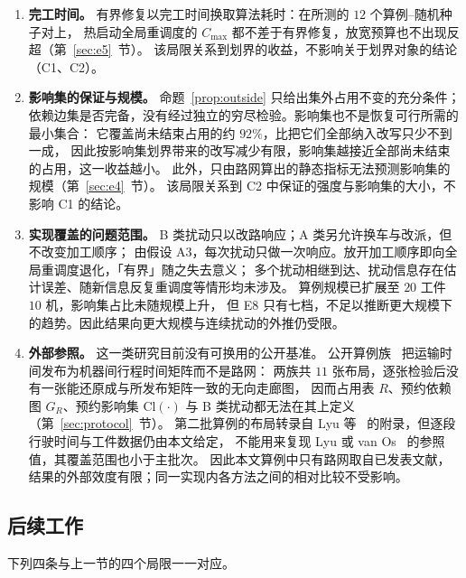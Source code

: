 \documentclass[manuscript,screen,review]{acmart}
\newcommand{\EfiveCells}{12}        %
\newcommand{\ClosureAliveFrac}{92\%}
\newcommand{\ScaleJobsHi}{20}
\newcommand{\ScaleMachHi}{10}
\begin{document}
\begin{enumerate}[leftmargin=1.6em,itemsep=0.35em]
\item \textbf{完工时间。} 有界修复以完工时间换取算法耗时：在所测的 \(\EfiveCells\) 个算例--随机种子对上，
热启动全局重调度的 \(C_{\max}\) 都不差于有界修复，放宽预算也不出现反超（第~\ref{sec:e5}~节）。
该局限关系到划界的收益，不影响关于划界对象的结论（C1、C2）。

\item \textbf{影响集的保证与规模。} 命题~\ref{prop:outside} 只给出集外占用不变的充分条件；
依赖边集是否完备，没有经过独立的穷尽检验。影响集也不是恢复可行所需的最小集合：
它覆盖尚未结束占用的约 \(\ClosureAliveFrac\)，比把它们全部纳入改写只少不到一成，
因此按影响集划界带来的改写减少有限，影响集越接近全部尚未结束的占用，这一收益越小。
此外，只由路网算出的静态指标无法预测影响集的规模（第~\ref{sec:e4}~节）。
该局限关系到 C2 中保证的强度与影响集的大小，不影响 C1 的结论。

\item \textbf{实现覆盖的问题范围。} B 类扰动只以改路响应；A 类另允许换车与改派，但不改变加工顺序；
由假设 A3，每次扰动只做一次响应。放开加工顺序即向全局重调度退化，「有界」随之失去意义；
多个扰动相继到达、扰动信息存在估计误差、随新信息反复重调度等情形均未涉及。
算例规模已扩展至 \(\ScaleJobsHi\) 工件 \(\ScaleMachHi\) 机，影响集占比未随规模上升，
但 E8 只有七档，不足以推断更大规模下的趋势。因此结果向更大规模与连续扰动的外推仍受限。

\item \textbf{外部参照。} 这一类研究目前没有可换用的公开基准。
公开算例族~\cite{homayouni2021production,fontes2023hybrid} 把运输时间发布为机器间行程时间矩阵而不是路网：
两族共 \(11\) 张布局，逐张检验后没有一张能还原成与所发布矩阵一致的无向走廊图，
因而占用表 \(R\)、预约依赖图 \(G_R\)、预约影响集 \(\mathrm{Cl}(\cdot)\) 与 B 类扰动都无法在其上定义（第~\ref{sec:protocol}~节）。
第二批算例的布局转录自 Lyu 等~\cite{lyu2019approach} 的附录，但逐段行驶时间与工件数据仍由本文给定，
不能用来复现 Lyu 或 van Os~\cite{vanos2026exact} 的参照值，其覆盖范围也小于主批次。
因此本文算例中只有路网取自已发表文献，结果的外部效度有限；同一实现内各方法之间的相对比较不受影响。
\end{enumerate}

\subsection{后续工作}
\label{sec:future}

下列四条与上一节的四个局限一一对应。
\end{document}

